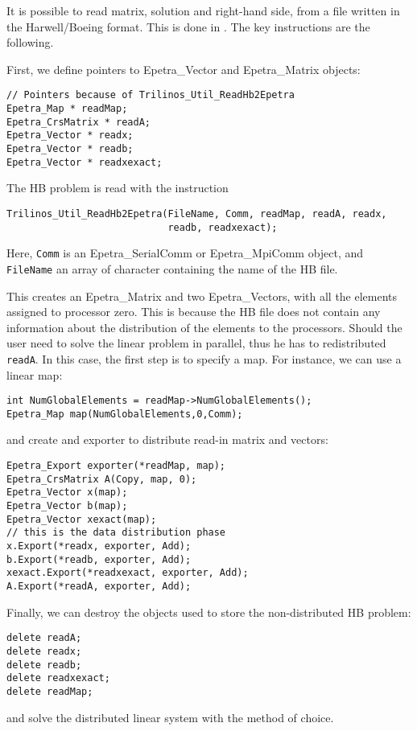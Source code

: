 It is possible to read matrix, solution and right-hand side, from a file
written in the Harwell/Boeing format. This is done in \newline
{}. The key instructions are the following.

First, we define pointers to Epetra\_Vector and Epetra\_Matrix objects:
\begin{verbatim}
// Pointers because of Trilinos_Util_ReadHb2Epetra
Epetra_Map * readMap;
Epetra_CrsMatrix * readA; 
Epetra_Vector * readx; 
Epetra_Vector * readb;
Epetra_Vector * readxexact;
\end{verbatim}
The HB problem is read with the instruction
\begin{verbatim}
Trilinos_Util_ReadHb2Epetra(FileName, Comm, readMap, readA, readx, 
                            readb, readxexact);   
\end{verbatim}
Here, \verb!Comm! is an Epetra\_SerialComm or Epetra\_MpiComm object,
and \verb!FileName! an array of character containing the name of the HB
file.

This creates an Epetra\_Matrix and two Epetra\_Vectors, with all the
elements assigned to processor zero. This is because the HB file does
not contain any information about the distribution of the elements to
the processors.  Should the user need to solve the linear problem in
parallel, thus he has to redistributed \verb!readA!. In this case, the
first step is to specify a map.  For instance, we can use a linear map:
\begin{verbatim}
int NumGlobalElements = readMap->NumGlobalElements();
Epetra_Map map(NumGlobalElements,0,Comm);
\end{verbatim}
and create and exporter to distribute read-in matrix and vectors:
\begin{verbatim}
Epetra_Export exporter(*readMap, map);
Epetra_CrsMatrix A(Copy, map, 0);
Epetra_Vector x(map);
Epetra_Vector b(map);
Epetra_Vector xexact(map);
// this is the data distribution phase
x.Export(*readx, exporter, Add);
b.Export(*readb, exporter, Add);
xexact.Export(*readxexact, exporter, Add);
A.Export(*readA, exporter, Add);
\end{verbatim}
Finally, we can destroy the objects used to store the non-distributed HB
problem:
\begin{verbatim}
delete readA;
delete readx;
delete readb;
delete readxexact;
delete readMap;
\end{verbatim}
and solve the distributed linear system with the method of choice.

